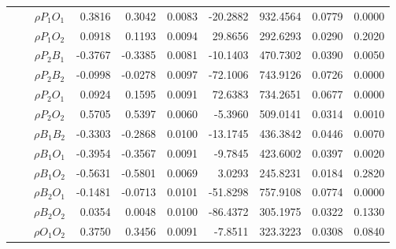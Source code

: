\documentclass[letterpaper]{article}
\begin{document}
\begin{table}[h]
\begin{tabular}{cccrrrrrrr}
            &             & $\rho{P_1O_1}$ & 0.3816                 & 0.3042                 & 0.0083                 & -20.2882               & 932.4564               & 0.0779                   & 0.0000                 \\
            &             & $\rho{P_1O_2}$ & 0.0918                 & 0.1193                 & 0.0094                 & 29.8656                & 292.6293               & 0.0290                   & 0.2020                 \\
            &             & $\rho{P_2B_1}$ & -0.3767                & -0.3385                & 0.0081                 & -10.1403               & 470.7302               & 0.0390                   & 0.0050                 \\
            &             & $\rho{P_2B_2}$ & -0.0998                & -0.0278                & 0.0097                 & -72.1006               & 743.9126               & 0.0726                   & 0.0000                 \\
            &             & $\rho{P_2O_1}$ & 0.0924                 & 0.1595                 & 0.0091                 & 72.6383                & 734.2651               & 0.0677                   & 0.0000                 \\
            &             & $\rho{P_2O_2}$ & 0.5705                 & 0.5397                 & 0.0060                 & -5.3960                & 509.0141               & 0.0314                   & 0.0010                 \\
            &             & $\rho{B_1B_2}$ & -0.3303                & -0.2868                & 0.0100                 & -13.1745               & 436.3842               & 0.0446                   & 0.0070                 \\
            &             & $\rho{B_1O_1}$ & -0.3954                & -0.3567                & 0.0091                 & -9.7845                & 423.6002               & 0.0397                   & 0.0020                 \\
            &             & $\rho{B_1O_2}$ & -0.5631                & -0.5801                & 0.0069                 & 3.0293                 & 245.8231               & 0.0184                   & 0.2820                 \\
            &             & $\rho{B_2O_1}$ & -0.1481                & -0.0713                & 0.0101                 & -51.8298               & 757.9108               & 0.0774                   & 0.0000                 \\
            &             & $\rho{B_2O_2}$ & 0.0354                 & 0.0048                 & 0.0100                 & -86.4372               & 305.1975               & 0.0322                   & 0.1330                 \\
            &             & $\rho{O_1O_2}$ & 0.3750                 & 0.3456                 & 0.0091                 & -7.8511                & 323.3223               & 0.0308                   & 0.0840                 \\\hline
\end{tabular}
\end{table}
\end{document}
